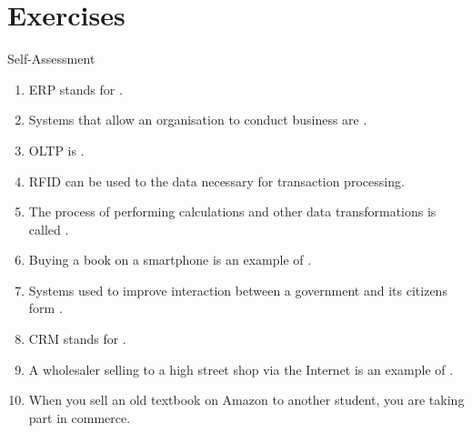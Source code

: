 \documentclass[\main/notes.tex]{subfiles}
\begin{document}
		\pagebreak
		\section{Exercises}
			\begin{exercise}{Self-Assessment}
				\begin{enumerate}
					\item ERP stands for .
					\item Systems that allow an organisation to conduct business are .
					\item OLTP is .
					\item RFID can be used to  the data necessary for transaction processing.
					\item The process of performing calculations and other data transformations is called .
					\item Buying a book on a smartphone is an example of .
					\item Systems used to improve interaction between a government and its citizens form .
					\item CRM stands for .
					\item A wholesaler selling to a high street shop via the Internet is an example of .
					\item When you sell an old textbook on Amazon to another student, you are taking part in  commerce.
				\end{enumerate}
			\end{exercise}
	\vbox{}
\end{document}
